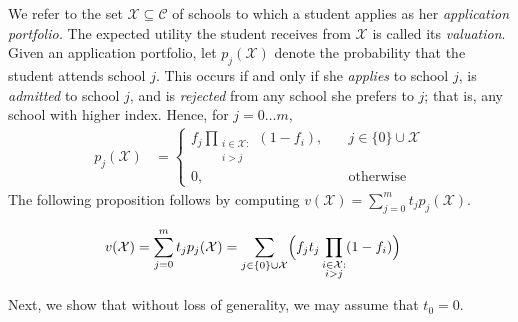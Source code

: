 We refer to the set $\mathcal{X} \subseteq \mathcal{C}$ of schools to which a student applies as her \emph{application portfolio.} The expected utility the student receives from $\mathcal{X}$ is called its \emph{valuation}. Given an application portfolio, let $p_j(\mathcal{X})$ denote the probability that the student attends school $j$. This occurs if and only if she \emph{applies} to school $j$, is \emph{admitted} to school $j$, and is \emph{rejected} from any school she prefers to $j$; that is, any school with higher index. Hence, for $j= 0\dots m$,
\begin{align}
p_j(\mathcal{X}) &= 
\begin{cases}
\displaystyle f_j  \prod_{\substack{i \in \mathcal{X}: \\ i > j}} (1 - f_{i}), \quad & j \in \{0\}\cup\mathcal{X}\\
0, \quad & \text{otherwise}
\end{cases} 
\end{align}
The following proposition follows by computing $v(\mathcal{X}) = \sum_{j=0}^m  t_j p_j(\mathcal{X})$.
\begin{proposition}
\begin{align}
v(\mathcal{X}) &= \sum_{j=0}^m t_j p_j(\mathcal{X}) = \sum_{j\in\{0\}\cup\mathcal{X}} \Bigl( f_j t_j \prod_{\substack{i \in \mathcal{X}: \\ i > j}} (1 - f_{i}) \Bigr)  \label{closedformportfoliovaluationX}%
\end{align}
\end{proposition}

Next, we show that without loss of generality, we may assume that $t_0 = 0$.


